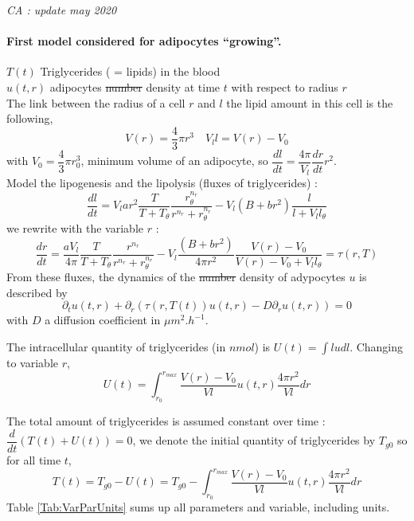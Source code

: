 \documentclass[11pt,a4paper]{article}
\newcommand{\CA}[1]{{\color{mypurple} \emph{CA : #1} }}
\begin{document}
\CA{update may 2020}

\paragraph{First model considered for adipocytes ``growing''.\\}
$T(t)$ Triglycerides ( = lipids) in the blood\\
$u(t,r)$ adipocytes \sout{number} density at time $t$ with respect to radius $r$\\
The link between the radius of a cell $r$ and $l$ the lipid amount in this cell is the following,
$$V(r) = \dfrac{4}{3} \pi r^3 \quad V_l l = V(r) - V_{0}$$
with $V_{0} = \dfrac{4}{3} \pi r_{0}^3$, minimum volume of an adipocyte, so $\dfrac{dl}{dt} = \dfrac{4\pi}{V_l} \dfrac{dr}{dt} r^2$.\\

Model the lipogenesis and the lipolysis (fluxes of triglycerides) : 
$$\dfrac{dl}{dt} = V_l a r^2 \dfrac{T}{T + T_{\theta}} \dfrac{r_{\theta}^{n_r}}{r^{n_r}+r_{\theta}^{n_r}} - V_l (B + br^2) \dfrac{l}{l + V_l l_{\theta}}$$
we rewrite with the variable $r$ : 
$$\dfrac{dr}{dt} = \dfrac{aV_l}{4\pi}  \dfrac{T}{T + T_{\theta}} \dfrac{r^{n_r}}{r^{n_r}+ r_{\theta}^{n_r}} - V_l \dfrac{(B + br^2)}{4\pi r^2} \dfrac{V(r) - V_0}{V(r) - V_0 + V_l  l_{\theta}} = \tau(r, T)$$
From these fluxes, the dynamics of the \sout{number} density of adypocytes $u$ is described by 
$$\partial_t u(t, r) + \partial_r( \tau(r, T(t)) u(t,r) - D \partial_r u(t,r)) = 0$$
with $D$ a diffusion coefficient in $\mu m^2 . h^{-1}$.

The intracellular quantity of triglycerides (in $nmol$) is $U(t) = \displaystyle \int l u dl$. Changing to variable $r$, 
$$U(t) = \int_{r_0}^{r_{max}} \dfrac{V(r) - V_0}{Vl} u(t, r) \dfrac{4\pi r^2}{Vl} dr$$

The total amount of triglycerides is assumed constant over time : $\dfrac{d}{dt}(T(t) + U(t)) = 0$, we denote the initial quantity of triglycerides by $T_{g0}$ so for all time $t$, $$T(t) = T_{g0} - U(t) =  T_{g0} - \int_{r_0}^{r_{max}} \dfrac{V(r) - V_0}{Vl} u(t, r) \dfrac{4\pi r^2}{Vl} dr$$
Table \ref{Tab:VarParUnits} sums up all parameters and variable, including units.
\end{document}
